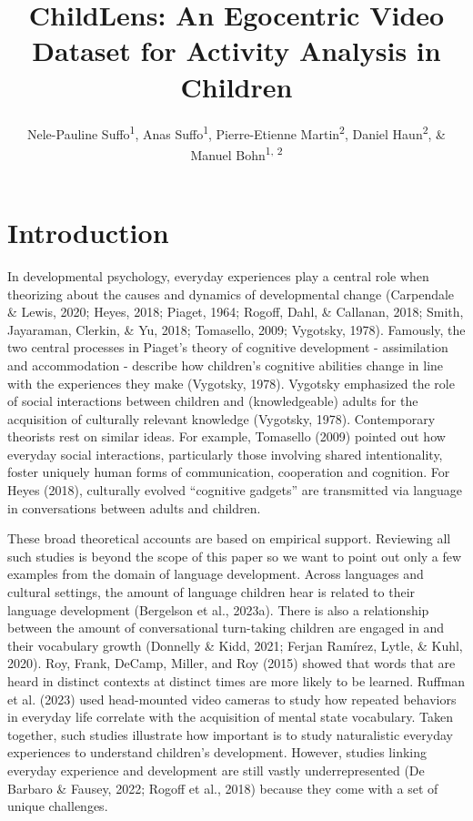 \documentclass[
  man,floatsintext]{apa6}
\title{ChildLens: An Egocentric Video Dataset for Activity Analysis in Children}
\author{Nele-Pauline Suffo\textsuperscript{1}, Anas Suffo\textsuperscript{1}, Pierre-Etienne Martin\textsuperscript{2}, Daniel Haun\textsuperscript{2}, \& Manuel Bohn\textsuperscript{1, 2}}
\date{}
\affiliation{\vspace{0.5cm}\textsuperscript{1} Institute of Psychology in Education, Leuphana University Lüneburg\\\textsuperscript{2} Max Planck Institute for Evolutionary Anthropology}
\begin{document}
\maketitle

\section{Introduction}\label{introduction}

In developmental psychology, everyday experiences play a central role when theorizing about the causes and dynamics of developmental change (Carpendale \& Lewis, 2020; Heyes, 2018; Piaget, 1964; Rogoff, Dahl, \& Callanan, 2018; Smith, Jayaraman, Clerkin, \& Yu, 2018; Tomasello, 2009; Vygotsky, 1978). Famously, the two central processes in Piaget's theory of cognitive development - assimilation and accommodation - describe how children's cognitive abilities change in line with the experiences they make (Vygotsky, 1978). Vygotsky emphasized the role of social interactions between children and (knowledgeable) adults for the acquisition of culturally relevant knowledge (Vygotsky, 1978). Contemporary theorists rest on similar ideas. For example, Tomasello (2009) pointed out how everyday social interactions, particularly those involving shared intentionality, foster uniquely human forms of communication, cooperation and cognition. For Heyes (2018), culturally evolved ``cognitive gadgets'' are transmitted via language in conversations between adults and children.

These broad theoretical accounts are based on empirical support. Reviewing all such studies is beyond the scope of this paper so we want to point out only a few examples from the domain of language development. Across languages and cultural settings, the amount of language children hear is related to their language development (Bergelson et al., 2023a). There is also a relationship between the amount of conversational turn-taking children are engaged in and their vocabulary growth (Donnelly \& Kidd, 2021; Ferjan Ramírez, Lytle, \& Kuhl, 2020). Roy, Frank, DeCamp, Miller, and Roy (2015) showed that words that are heard in distinct contexts at distinct times are more likely to be learned. Ruffman et al. (2023) used head-mounted video cameras to study how repeated behaviors in everyday life correlate with the acquisition of mental state vocabulary. Taken together, such studies illustrate how important is to study naturalistic everyday experiences to understand children's development. However, studies linking everyday experience and development are still vastly underrepresented (De Barbaro \& Fausey, 2022; Rogoff et al., 2018) because they come with a set of unique challenges.
\end{document}
